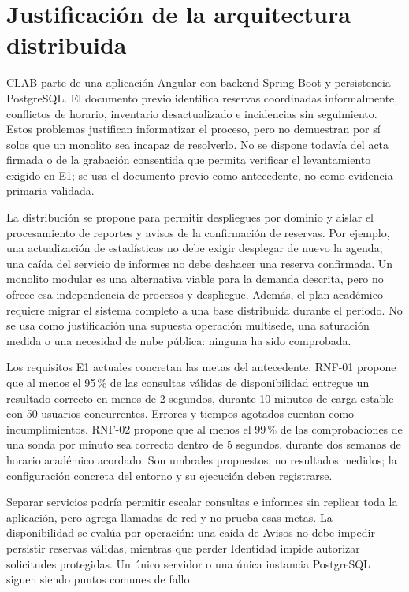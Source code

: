 \section{Justificación de la arquitectura distribuida}
\label{sec:clab-distribucion}

CLAB parte de una aplicación Angular con backend Spring Boot y persistencia
PostgreSQL. El documento previo identifica reservas coordinadas informalmente,
conflictos de horario, inventario desactualizado e incidencias sin seguimiento.
Estos problemas justifican informatizar el proceso, pero no demuestran por sí
solos que un monolito sea incapaz de resolverlo. No se dispone todavía del acta
firmada o de la grabación consentida que permita verificar el levantamiento
exigido en E1; se usa el documento previo como antecedente, no como evidencia
primaria validada.

La distribución se propone para permitir despliegues por dominio y aislar el
procesamiento de reportes y avisos de la confirmación de reservas. Por ejemplo,
una actualización de estadísticas no debe exigir desplegar de nuevo la agenda;
una caída del servicio de informes no debe deshacer una reserva confirmada.
Un monolito modular es una alternativa viable para la demanda descrita, pero no
ofrece esa independencia de procesos y despliegue. Además, el plan académico
requiere migrar el sistema completo a una base distribuida durante el periodo.
No se usa como justificación una supuesta operación multisede, una saturación
medida o una necesidad de nube pública: ninguna ha sido comprobada.

Los requisitos E1 actuales concretan las metas del antecedente. RNF-01 propone
que al menos el 95\,\% de las consultas válidas de disponibilidad entregue un
resultado correcto en menos de 2 segundos, durante 10 minutos de carga estable
con 50 usuarios concurrentes. Errores y tiempos agotados cuentan como
incumplimientos. RNF-02 propone que al menos el 99\,\% de las comprobaciones de
una sonda por minuto sea correcto dentro de 5 segundos, durante dos semanas
de horario académico acordado. Son umbrales propuestos, no resultados medidos;
la configuración concreta del entorno y su ejecución deben registrarse.

Separar servicios podría permitir escalar consultas e informes sin replicar
toda la aplicación, pero agrega llamadas de red y no prueba esas metas.
La disponibilidad se evalúa por operación: una caída de Avisos no debe impedir
persistir reservas válidas, mientras que perder Identidad impide autorizar
solicitudes protegidas. Un único servidor o una única instancia PostgreSQL
siguen siendo puntos comunes de fallo.

